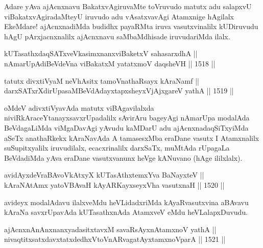 \begin{artha}
Adare yAva ajAcnxnavu BakatxvAgiruvaMte toVruvudo matutx adu salapxvU viBakatxvAgiradaMteyU iruvudo adu vAsatxvavAgi Atamxnige hAgilalx EkeMdare! ajAcnxnadiMda budidhx payaRMta iruva vasutxvinalilx kUDiruvudu hAgU pArxjacnxnalilx ajAcnxnavu saMbaMdhisade iruvudariMda ilalx.
\end{artha}


\begin{shl}
kUTasathxdaqSATxveVkasimxnanxviBaketxV sahasarxdhA || \\
nAmarUpAdiBeVdeVna viBakatxM yatatxmoV daqsheVH ||  1518 ||  
\end{shl}
				
\begin{shl}
tatutx divxtiVyaM neVhAsitx tamoV\s nathaRsayx kAraNamf || \\
darxSATxrXdirUpasaMBeVdAdayxtapxsheyxVjAjxgareV yathA ||  1519 ||  
\end{shl}

\begin{artha}
oMdeV adivxtiVyavAda matutx viBAgavilalxda niviRkAraceYtanayxsavxrUpadalilx sAvirAru bageyAgi nAmarUpa modalAda BeVdagaLiMda viMgaDavAgi yAvudu kaMDarU adu ajAcnxnadaqSiTxyiMda aSeTx anathaRkekx kAraNavAda A tamasesxMba eraDane vasutx I Atamxnalilx suSupitxyalilx iruvudilalx, ecacxrinalilx darxSaTx, muMtAda rUpagaLa BeVdadiMda yAva eraDane vasutxvanunx heVge kANuvano (hAge ililxlalx).
\end{artha}


\begin{shl}
avidAyxdeVraBAvoVkAtxyX kUTasAthxtemxYva BaNayxteV ||  \\
kAraNAtAmx yatoV\s BAvaH kAyARKayxseyxVha vasutxnaH ||  1520 ||  
\end{shl}

\begin{artha}
avideyx modalAdavu ilalxveMdu heVLidadxriMda kAyaRvasutxvina aBAvavu kAraNa savxrUpavAda kUTasathxnAda AtamxveV eMdu heVLalapxDuvudu.
\end{artha}


\begin{shl}
ajAcnxnAnAnxnanxyadasitxtavxM savaRsAyxnAtamxnoV yathA ||  \\
nivaqtitxsatxdavxtatxdedhxVtoVnARvagatAyxtamxnoV\s parA ||  1521 ||  
\end{shl}

